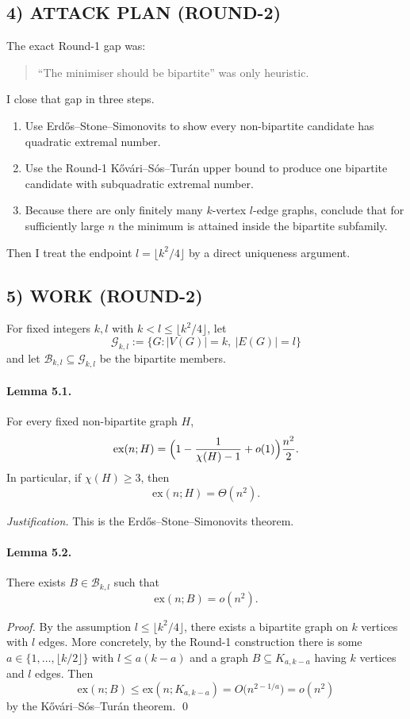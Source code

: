 \subsection*{4) ATTACK PLAN (ROUND-2)}
The exact Round-1 gap was:
\begin{quote}
``The minimiser should be bipartite'' was only heuristic.
\end{quote}
I close that gap in three steps.
\begin{enumerate}
\item Use Erd\H{o}s--Stone--Simonovits to show every non-bipartite candidate has quadratic extremal number.
\item Use the Round-1 K\H{o}v\'ari--S\'os--Tur\'an upper bound to produce one bipartite candidate with subquadratic extremal number.
\item Because there are only finitely many $k$-vertex $l$-edge graphs, conclude that for sufficiently large $n$ the minimum is attained inside the bipartite subfamily.
\end{enumerate}
Then I treat the endpoint $l=\lfloor k^2/4\rfloor$ by a direct uniqueness argument.

\subsection*{5) WORK (ROUND-2)}
For fixed integers $k,l$ with $k<l\le \lfloor k^2/4\rfloor$, let
\[
\mathcal G_{k,l}:=\{G: |V(G)|=k,\ |E(G)|=l\}
\]
and let $\mathcal B_{k,l}\subseteq \mathcal G_{k,l}$ be the bipartite members.

\paragraph{Lemma 5.1.}
For every fixed non-bipartite graph $H$,
\[
\mathrm{ex}(n;H)=\Bigl(1-\frac{1}{\chi(H)-1}+o(1)\Bigr)\frac{n^2}{2}.
\]
In particular, if $\chi(H)\ge 3$, then
\[
\mathrm{ex}(n;H)=\Theta(n^2).
\]

\emph{Justification.}
This is the Erd\H{o}s--Stone--Simonovits theorem.

\paragraph{Lemma 5.2.}
There exists $B\in \mathcal B_{k,l}$ such that
\[
\mathrm{ex}(n;B)=o(n^2).
\]

\emph{Proof.}
By the assumption $l\le \lfloor k^2/4\rfloor$, there exists a bipartite graph on $k$ vertices with $l$ edges. More concretely, by the Round-1 construction there is some $a\in\{1,\dots,\lfloor k/2\rfloor\}$ with $l\le a(k-a)$ and a graph $B\subseteq K_{a,k-a}$ having $k$ vertices and $l$ edges. Then
\[
\mathrm{ex}(n;B)\le \mathrm{ex}(n;K_{a,k-a})=O\bigl(n^{2-1/a}\bigr)=o(n^2)
\]
by the K\H{o}v\'ari--S\'os--Tur\'an theorem. \qed

